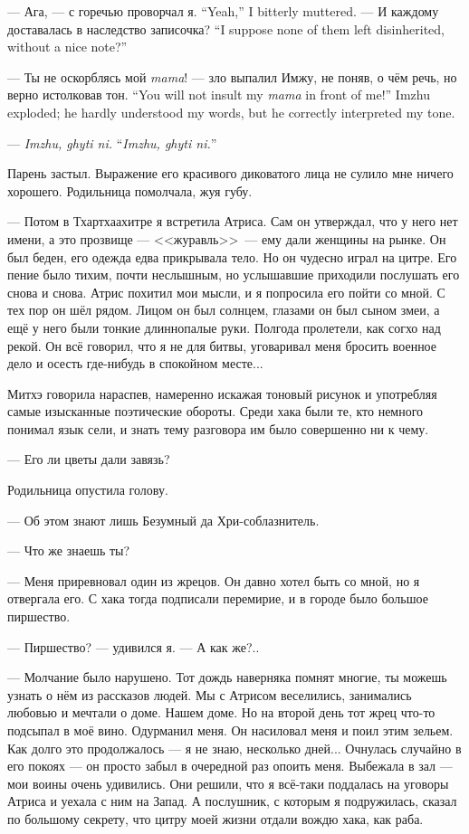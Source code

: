 {--- Ага, --- с горечью проворчал я.}
{``Yeah,'' I bitterly muttered.}
{--- И каждому доставалась в наследство записочка?}
{``I suppose none of them left disinherited, without a nice note?''}

{--- Ты не оскорблясь мой \textit{mama}! --- зло выпалил Имжу, не поняв, о чём речь, но верно истолковав тон.}
{``You will not insult my \textit{mama} in front of me!'' Imzhu exploded; he hardly understood my words, but he correctly interpreted my tone.}

{--- \textit{Imzhu, ghyti ni.}}
{``\textit{Imzhu, ghyti ni.}''}

Парень застыл.
Выражение его красивого диковатого лица не сулило мне ничего хорошего.
Родильница помолчала, жуя губу.

--- Потом в Тхартхаахитре я встретила Атриса.
Сам он утверждал, что у него нет имени, а это прозвище --- <<журавль>>\FM\ --- ему дали женщины на рынке.
Он был беден, его одежда едва прикрывала тело.
Но он чудесно играл на цитре.
Его пение было тихим, почти неслышным, но услышавшие приходили послушать его снова и снова.
Атрис похитил мои мысли, и я попросила его пойти со мной.
С тех пор он шёл рядом.
Лицом он был солнцем, глазами он был сыном змеи, а ещё у него были тонкие длиннопалые руки.
Полгода пролетели, как согхо над рекой.
Он всё говорил, что я не для битвы, уговаривал меня бросить военное дело и осесть где-нибудь в спокойном месте...

Митхэ говорила нараспев, намеренно искажая тоновый рисунок и употребляя самые изысканные поэтические обороты.
Среди хака были те, кто немного понимал язык сели, и знать тему разговора им было совершенно ни к чему.

--- Его ли цветы дали завязь?

Родильница опустила голову.

--- Об этом знают лишь Безумный да Хри-соблазнитель.

--- Что же знаешь ты?

--- Меня приревновал один из жрецов.
Он давно хотел быть со мной, но я отвергала его.
С хака тогда подписали перемирие, и в городе было большое пиршество.

--- Пиршество? --- удивился я.
--- А как же?..

--- Молчание было нарушено.
Тот дождь наверняка помнят многие, ты можешь узнать о нём из рассказов людей.
Мы с Атрисом веселились, занимались любовью и мечтали о доме.
Нашем доме.
Но на второй день тот жрец что-то подсыпал в моё вино.
Одурманил меня.
Он насиловал меня и поил этим зельем.
Как долго это продолжалось --- я не знаю, несколько дней...
Очнулась случайно в его покоях --- он просто забыл в очередной раз опоить меня.
Выбежала в зал --- мои воины очень удивились.
Они решили, что я всё-таки поддалась на уговоры Атриса и уехала с ним на Запад.
А послушник, с которым я подружилась, сказал по большому секрету, что цитру моей жизни отдали вождю хака, как раба.

